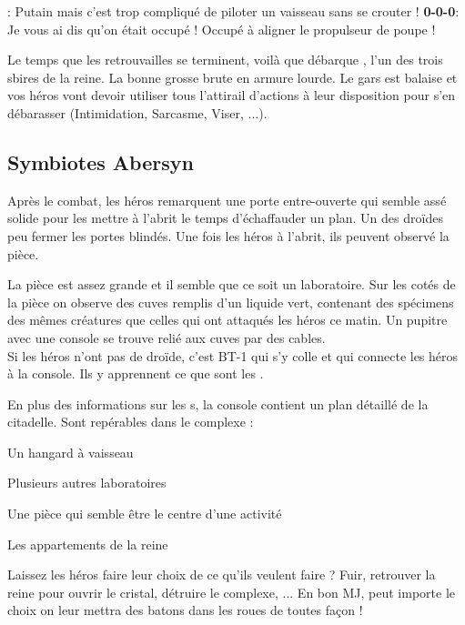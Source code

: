 \begin{quotebox}
\noindent\textbf{}: Putain mais c’est trop compliqué de piloter un vaisseau sans se crouter !
\noindent\textbf{0-0-0}: Je vous ai dis qu’on était occupé ! Occupé à aligner le propulseur de poupe !
\end{quotebox}

Le temps que les retrouvailles se terminent, voilà que débarque , l’un des trois sbires de la reine. La bonne grosse brute en armure lourde. Le gars est balaise et vos héros vont devoir utiliser tous l’attirail d’actions à leur disposition pour s’en débarasser (Intimidation, Sarcasme, Viser, ...).

\subsection{Symbiotes Abersyn}

Après le combat, les héros remarquent une porte entre-ouverte qui semble assé solide pour les mettre à l’abrit le temps d’échaffauder un plan. Un des droïdes peu fermer les portes blindés. Une fois les héros à l’abrit, ils peuvent observé la pièce. 

La pièce est assez grande et il semble que ce soit un laboratoire. Sur les cotés de la pièce on observe des cuves remplis d’un liquide vert, contenant des spécimens des mêmes créatures que celles qui ont attaqués les héros ce matin. Un pupitre avec une console se trouve relié aux cuves par des cables. \\

Si les héros n’ont pas de droïde, c’est BT-1 qui s’y colle et qui connecte les héros à la console. Ils y apprennent ce que sont les .

En plus des informations sur les s, la console contient un plan détaillé de la citadelle. Sont repérables dans le complexe :

\begin{rebelist}
	\item Un hangard à vaisseau
	\item Plusieurs autres laboratoires
	\item Une pièce qui semble être le centre d’une activité
    \item Les appartements de la reine
\end{rebelist}

Laissez les héros faire leur choix de ce qu’ils veulent faire ? Fuir, retrouver la reine pour ouvrir le cristal, détruire le complexe, ... En bon MJ, peut importe le choix on leur mettra des batons dans les roues de toutes façon !

